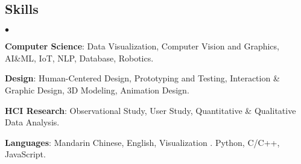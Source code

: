 \documentclass[margin,line]{res}
\newenvironment{list2}{
  \begin{list}{$\bullet$}{%
      \setlength{\itemsep}{0in}
      \setlength{\parsep}{0in} \setlength{\parskip}{0in}
      \setlength{\topsep}{0in} \setlength{\partopsep}{0in} 
      \setlength{\leftmargin}{0.2in}}}{\end{list}}
\begin{document}
\begin{resume}
\section{Skills} 

\begin{list2}
\item \textbf{Computer Science}: Data Visualization, Computer Vision and Graphics, AI\&ML, IoT, NLP, Database, Robotics.
\vspace{.1cm}
\item \textbf{Design}: Human-Centered Design, Prototyping and Testing, Interaction \& Graphic Design, 3D Modeling, Animation Design.
\vspace{.1cm}
\item \textbf{HCI Research}: Observational Study, User Study, Quantitative \& Qualitative Data Analysis.
\vspace{.1cm}
\item \textbf{Languages}: Mandarin Chinese, English, Visualization \raisebox{-0.5ex}{}. Python, C/C++, JavaScript.
\end{list2}


\end{resume}
\end{document}
